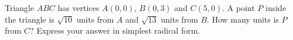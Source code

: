 Triangle $ABC$ has vertices $A(0,0)$, $B(0,3)$ and $C(5,0)$. A point $P$ inside the triangle is $\sqrt{10}$ units from $A$ and $\sqrt{13}$ units from $B$. How many units is $P$ from $C$? Express your answer in simplest radical form.
